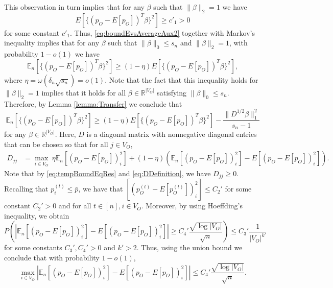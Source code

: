 \documentclass[opre,nonblindrev]{informs3} %
\def\En{{\mathbb{E}_n}}
\begin{document}
\begin{APPENDIX}{}
This observation in turn implies that   for any $\beta$ such that $\|\beta\|_2=1$ we have
\begin{equation}\label{eq:auxResultEigenBound}
E[\{(p_O- E[p_O])^T \beta\}^2] \geq c'_1>0
\end{equation}
for some constant $c'_1$.
Thus,  \eqref{eq:boundEvsAverageAux2} together with Markov's inequality implies that
for any $\beta$ such that
$\|\beta\|_0\leq s_n $ and
$\|\beta\|_2=1$,
with probability $1-o(1)$ we have
\begin{equation}\label{eq:tempBoundEqRes}
\En[\{(p_O-E[p_O])^T\beta\}^2] \geq (1-\eta)E[\{(p_O-E[p_O])^T\beta\}^2],
\end{equation}
where
$\eta = \omega(\delta_n \sqrt{s_n}) =o(1)$.
Note that the fact that this inequality holds for  $\|\beta\|_2=1$ implies that it holds for all $\beta \in \mathbb{R}^{|{V}_O|}$ satisfying $\|\beta\|_0\leq s_n $.
Therefore, by Lemma \ref{lemma:Transfer} we conclude that
\begin{equation}\label{eq:intStepAux}
\En[\{(p_O-E[p_O])^T \beta\}^2] \geq (1-\eta)E[\{(p_O-E[p_O])^T \beta\}^2]- \frac{\|D^{1/2}\beta\|_1^2}{s_n-1}
\end{equation}
for any $\beta \in \mathbb{R}^{|{V}_O|}$. Here,
$D$ is a diagonal matrix with nonnegative diagonal entries that can be chosen so that
for all $j\in {V}_O$,
\begin{equation} \label{eq:DDefinition}
\begin{aligned}
D_{jj} &= \max_{i\in {V}_O} ~
\eta\En[ (p_O-E[p_O])_i^2 ]+
(1-\eta) \left(\En[ ( p_O-E[p_O])_i^2 ]-
E[ ( p_O-E[p_O])_i^2 ] \right).
\end{aligned}
\end{equation}
Note that by \eqref{eq:tempBoundEqRes} and \eqref{eq:DDefinition}, we have
$D_{jj}\geq 0$.
Recalling that $p_i^{(t)}\leq \bar{p}$, we have that
$[ ( p_O^{(t)}-E[p_O^{(t)}])_i^2 ] \leq C_2'$ for some constant $C_2'>0$ and for all $t\in[n], i\in V_O$.
Moreover, by using Hoeffding's inequality,
we obtain
\[
P
\left(\left| \En[ ( p_O-E[p_O])_i^2 ]-
E[ ( p_O-E[p_O])_i^2 ]  \right|
\geq  C_4' \frac{\sqrt{\log |V_O|}}{\sqrt{n}}
\right)
\leq C_3' \frac{1}{|V_O|^{k'}}
\]
for some constants $C_3',C_4'>0$ and $k'>2$.
Thus, using the union bound we conclude that with probability $1-o(1)$,
\begin{equation} \label{eq:boundPDiff}
\max_{i \in {V}_O}
\left| \En[ ( p_O-E[p_O])_i^2 ]-
E[ ( p_O-E[p_O])_i^2 ]  \right|
\leq C_4' \frac{\sqrt{\log |V_O|}}{\sqrt{n}}.

\end{equation}
\end{APPENDIX}
\end{document}

